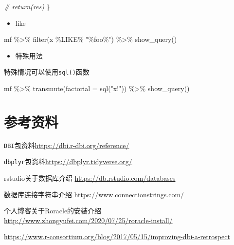 \documentclass[
]{book}
\newenvironment{Shaded}{\begin{snugshade}}{\end{snugshade}}
\newcommand{\AttributeTok}[1]{\textcolor[rgb]{0.77,0.63,0.00}{#1}}
\newcommand{\CommentTok}[1]{\textcolor[rgb]{0.56,0.35,0.01}{\textit{#1}}}
\newcommand{\FunctionTok}[1]{\textcolor[rgb]{0.00,0.00,0.00}{#1}}
\newcommand{\NormalTok}[1]{#1}
\newcommand{\SpecialCharTok}[1]{\textcolor[rgb]{0.00,0.00,0.00}{#1}}
\newcommand{\StringTok}[1]{\textcolor[rgb]{0.31,0.60,0.02}{#1}}
\providecommand{\tightlist}{%
  \setlength{\itemsep}{0pt}\setlength{\parskip}{0pt}}
\begin{document}
\begin{Shaded}
\begin{Highlighting}[]
  \CommentTok{\# return(res)}
\NormalTok{\}}
\end{Highlighting}
\end{Shaded}

\begin{itemize}
\tightlist
\item
  like
\end{itemize}

\begin{Shaded}
\begin{Highlighting}[]
\NormalTok{mf }\SpecialCharTok{\%\textgreater{}\%} 
  \FunctionTok{filter}\NormalTok{(x }\SpecialCharTok{\%LIKE\%} \StringTok{"\%foo\%"}\NormalTok{) }\SpecialCharTok{\%\textgreater{}\%} 
  \FunctionTok{show\_query}\NormalTok{()}
\end{Highlighting}
\end{Shaded}

\begin{itemize}
\tightlist
\item
  特殊用法
\end{itemize}

特殊情况可以使用\texttt{sql()}函数

\begin{Shaded}
\begin{Highlighting}[]
\NormalTok{mf }\SpecialCharTok{\%\textgreater{}\%} 
  \FunctionTok{transmute}\NormalTok{(}\AttributeTok{factorial =} \FunctionTok{sql}\NormalTok{(}\StringTok{"x!"}\NormalTok{)) }\SpecialCharTok{\%\textgreater{}\%} 
  \FunctionTok{show\_query}\NormalTok{()}
\end{Highlighting}
\end{Shaded}

\hypertarget{ux53c2ux8003ux8d44ux6599-2}{%
\section{参考资料}\label{ux53c2ux8003ux8d44ux6599-2}}

\texttt{DBI}包资料\url{https://dbi.r-dbi.org/reference/}

\texttt{dbplyr}包资料\url{https://dbplyr.tidyverse.org/}

rstudio关于数据库介绍 \url{https://db.rstudio.com/databases}

数据库连接字符串介绍 \url{https://www.connectionstrings.com/}

个人博客关于Roracle的安装介绍 \url{http://www.zhongyufei.com/2020/07/25/roracle-install/}

\url{https://www.r-consortium.org/blog/2017/05/15/improving-dbi-a-retrospect}
\end{document}

